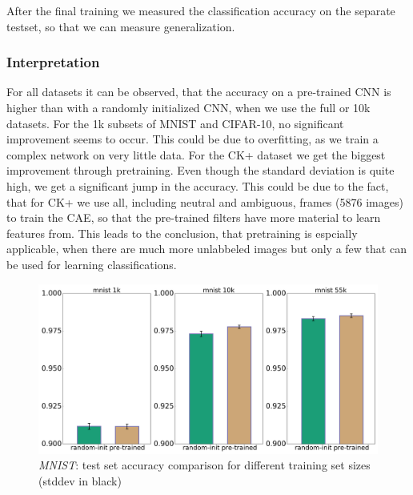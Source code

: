 \documentclass{article}
\begin{document}
    After the final training we measured the classification accuracy on the separate testset, so that we can measure generalization.
    \subsubsection{Interpretation}
      For all datasets it can be observed, that the accuracy on a pre-trained CNN is higher than with a randomly initialized CNN, when we use the full or 10k datasets.
      For the 1k subsets of MNIST and CIFAR-10, no significant improvement seems to occur. This could
      be due to overfitting, as we train a complex network on very little data.
      For the CK+ dataset we get the biggest improvement through pretraining.
      Even though the standard deviation is quite high, we get a significant jump in the accuracy.
      This could be due to the fact, that for CK+ we use all, including neutral and ambiguous, frames (5876 images) to train the CAE, so that the pre-trained filters have more material to learn features from.
      This leads to the conclusion, that pretraining is espcially applicable, when there are much more unlabbeled images but only a few that can be used for learning classifications.

    \begin{figure}
      \includegraphics[width=\linewidth]{../box_plots/boxplots_mnist.png}
      \caption{\emph{MNIST}: test set accuracy comparison for different training set sizes (stddev in black)}
      \label{fig:mnist_plot}
    \end{figure}
\end{document}
